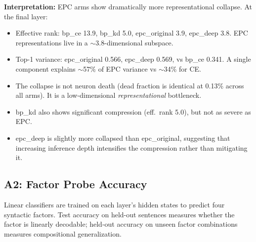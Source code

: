 \documentclass[11pt,a4paper]{article}
\begin{document}
\textbf{Interpretation:}
EPC arms show dramatically more representational collapse.
At the final layer:
\begin{itemize}[nosep]
  \item Effective rank: bp\_ce 13.9, bp\_kd 5.0, epc\_original 3.9,
    epc\_deep 3.8.  EPC representations live in a $\sim$3.8-dimensional
    subspace.
  \item Top-1 variance: epc\_original 0.566, epc\_deep 0.569, vs
    bp\_ce 0.341.  A single component explains $\sim$57\% of EPC
    variance vs $\sim$34\% for CE.
  \item The collapse is not neuron death (dead fraction is identical
    at 0.13\% across all arms).  It is a low-dimensional
    \textit{representational} bottleneck.
  \item bp\_kd also shows significant compression (eff.\ rank 5.0),
    but not as severe as EPC.
  \item epc\_deep is slightly more collapsed than epc\_original,
    suggesting that increasing inference depth intensifies the
    compression rather than mitigating it.
\end{itemize}

\subsection{A2: Factor Probe Accuracy}

Linear classifiers are trained on each layer's hidden states to
predict four syntactic factors.  Test accuracy on held-out sentences
measures whether the factor is linearly decodable; held-out accuracy
on unseen factor combinations measures compositional generalization.
\end{document}
